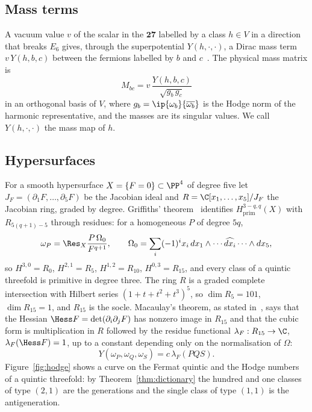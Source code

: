 \subsection{Mass terms}

A vacuum value $v$ of the scalar in the $\mathbf{27}$ labelled by a class
$h\in V$ in a direction that breaks $E_6$ gives, through the superpotential
$Y(h,\cdot,\cdot)$, a Dirac mass term $v\,Y(h,b,c)$ between the fermions
labelled by $b$ and $c$~\cite{Wit85}. The physical mass matrix is
\begin{equation}\label{eq:massmatrix}
M_{bc}=v\,\frac{Y(h,b,c)}{\sqrt{g_{b}\,g_{c}}}
\end{equation}
in an orthogonal basis of $V$, where $g_b=\ip{\omega_b}{\overline{\omega_b}}$
is the Hodge norm of the harmonic representative, and the masses are its
singular values. We call $Y(h,\cdot,\cdot)$ the mass map of $h$.

\subsection{Hypersurfaces}

For a smooth hypersurface $X=\{F=0\}\subset\PP^4$ of degree five let
$J_F=(\partial_1F,\dots,\partial_5F)$ be the Jacobian ideal and
$R=\C[x_1,\dots,x_5]/J_F$ the Jacobian ring, graded by degree. Griffiths'
theorem~\cite{Gri69} identifies $H^{3-q,q}_{\mathrm{prim}}(X)$ with
$R_{5(q+1)-5}$ through residues: for a homogeneous $P$ of degree $5q$,
\[
\omega_P=\Res_X\frac{P\,\Omega_0}{F^{q+1}},\qquad
\Omega_0=\sum_i(-1)^{i}x_i\,dx_1\wedge\cdots\widehat{dx_i}\cdots\wedge dx_5,
\]
so $H^{3,0}=R_0$, $H^{2,1}=R_5$, $H^{1,2}=R_{10}$, $H^{0,3}=R_{15}$, and
every class of a quintic threefold is primitive in degree three. The ring
$R$ is a graded complete intersection with Hilbert series
$(1+t+t^2+t^3)^5$, so $\dim R_5=101$, $\dim R_{15}=1$, and $R_{15}$ is the
socle. Macaulay's theorem, as stated in~\cite{CG80}, says that the Hessian
$\Hess F=\det(\partial_i\partial_jF)$ has nonzero image in $R_{15}$ and
that the cubic form is multiplication in $R$ followed by the residue
functional $\lambda_F:R_{15}\to\C$, $\lambda_F(\Hess F)=1$, up to a
constant depending only on the normalisation of $\Omega$:
\begin{equation}\label{eq:jacobianyukawa}
Y(\omega_P,\omega_Q,\omega_S)=c\,\lambda_F(PQS).
\end{equation}
Figure~\ref{fig:hodge} shows a curve on the Fermat quintic and the Hodge
numbers of a quintic threefold: by Theorem~\ref{thm:dictionary} the hundred and one classes
of type $(2,1)$ are the generations and the single class of type $(1,1)$
is the antigeneration.

